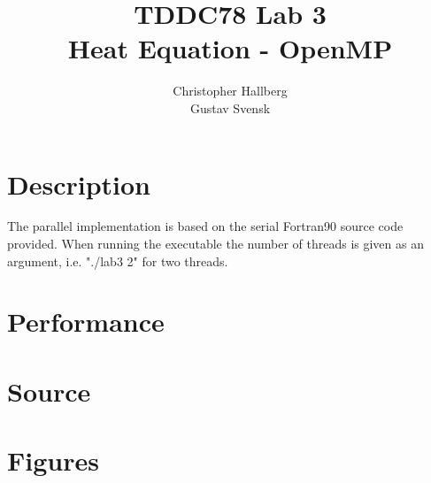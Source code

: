 \documentclass[a4paper, 12pt]{article}
\begin{document}
\title{TDDC78 Lab 3\\
        Heat Equation - OpenMP}
\author{Christopher Hallberg \\
        Gustav Svensk}
\maketitle

\thispagestyle{empty}

\newpage
\setcounter{page}{1}
\tableofcontents
\newpage

\section{Description}
The parallel implementation is based on the serial Fortran90 source code
provided. When running the executable the number of threads is given as
an argument, i.e. "./lab3 2" for two threads.   

\section{Performance}

\section{Source}

\newpage
\appendix
\section{Figures}
\end{document}
